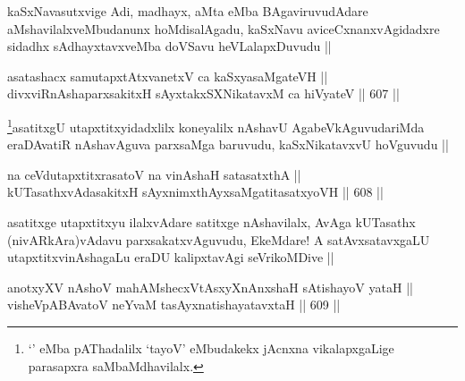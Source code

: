 \begin{artha}
kaSxNavasutxvige Adi, madhayx, aMta eMba BAgaviruvudAdare aMshavilalxveMbudanunx hoMdisalAgadu, kaSxNavu aviceCxnanxvAgidadxre sidadhx sAdhayxtavxveMba doVSavu heVLalapxDuvudu ||
\end{artha}

\begin{shl}
asatashacx samutapxtAtxvanetxV ca kaSxyasaMgateVH || \\
divxviRnAshaparxsakitxH sAyxtakxSXNikatavxM ca hiVyateV ||  607 ||  
\end{shl}	

\begin{artha}
\footnote{`\stext' eMba pAThadalilx `tayoV' eMbudakekx jAcnxna vikalapxgaLige parasapxra saMbaMdhavilalx.}asatitxgU utapxtitxyidadxlilx koneyalilx nAshavU AgabeVkAguvudariMda eraDAvatiR nAshavAguva parxsaMga baruvudu, kaSxNikatavxvU hoVguvudu ||
\end{artha}

\begin{shl}
na ceVdutapxtitxrasatoV na vinAshaH satasatxthA || \\
kUTasathxvAdasakitxH sAyxnimxthAyxsaMgatitasatxyoVH ||  608 ||  
\end{shl}

\begin{artha}
asatitxge utapxtitxyu ilalxvAdare satitxge nAshavilalx, AvAga kUTasathx (nivARkAra)vAdavu parxsakatxvAguvudu, EkeMdare! A satAvxsatavxgaLU utapxtitxvinAshagaLu eraDU kalipxtavAgi seVrikoMDive ||
\end{artha}

\begin{shl}
anotxyXV nAshoV mahAMshecxVtAsxyXnAnxshaH sAtishayoV yataH || \\
visheVpABAvatoV neYvaM tasAyxnatishayatavxtaH ||  609 || 
\end{shl}

